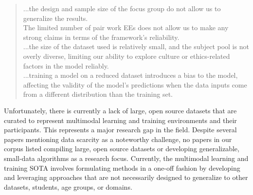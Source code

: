 \documentclass[manuscript,screen,review]{acmart}
\begin{document}
\begin{quote}
    ...the design and sample size of the focus group do not allow us to generalize the results. \cite{2609260641}\\
    
    The limited number of pair work EEs does not allow us to make any strong claims in terms of the framework’s reliability. \cite{2155422499}\\
    
    ...the size of the dataset used is relatively small, and the subject pool is not overly diverse, limiting our ability to explore culture or ethics-related factors in the model reliably. \cite{1426267857}\\
    
    ...training a model on a reduced dataset introduces a bias to the model, affecting the validity of the model’s predictions when the data inputs come from a different distribution than the training set. \cite{32184286}
\end{quote}
     
Unfortunately, there is currently a lack of large, open source datasets that are curated to represent multimodal learning and training environments and their participants. This represents a major research gap in the field. Despite several papers mentioning data scarcity as a noteworthy challenge, no papers in our corpus listed compiling large, open source datasets or developing generalizable, small-data algorithms as a research focus. Currently, the multimodal learning and training SOTA involves formulating methods in a one-off fashion by developing and leveraging approaches that are not necessarily designed to generalize to other datasets, students, age groups, or domains. 





\end{document}

